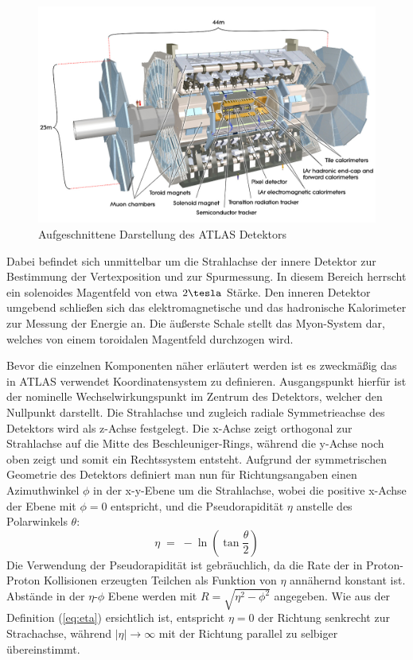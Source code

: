 \begin{figure}
    \centering
    \includegraphics[width=1.0\textwidth]{img/atlas}
    \caption[Aufgeschnittene Darstellung des ATLAS Detektors]
        {Aufgeschnittene Darstellung des ATLAS Detektors}
    \label{fig:atlas}
\end{figure}

Dabei befindet sich unmittelbar um die Strahlachse der innere Detektor zur
Bestimmung der Vertexposition und zur Spurmessung. In diesem Bereich herrscht
ein solenoides Magentfeld von etwa $2\tesla$ Stärke. Den inneren Detektor
umgebend schließen sich das elektromagnetische und das hadronische Kalorimeter
zur Messung der Energie an. Die äußerste Schale stellt das Myon-System dar,
welches von einem toroidalen Magentfeld durchzogen wird.

Bevor die einzelnen Komponenten näher erläutert werden ist es zweckmäßig das in
ATLAS verwendet Koordinatensystem zu definieren. Ausgangspunkt hierfür ist der
nominelle Wechselwirkungspunkt im Zentrum des Detektors, welcher den Nullpunkt
darstellt. Die Strahlachse und zugleich radiale Symmetrieachse des Detektors
wird als z-Achse festgelegt. Die x-Achse zeigt orthogonal zur Strahlachse auf
die Mitte des Beschleuniger-Rings, während die y-Achse noch oben zeigt und
somit ein Rechtssystem entsteht. Aufgrund der symmetrischen Geometrie des
Detektors definiert man nun für Richtungsangaben einen Azimuthwinkel
$\phi$ in der x-y-Ebene um die Strahlachse, wobei die positive x-Achse der
Ebene mit $\phi=0$ entspricht, und die Pseudorapidität $\eta$ anstelle des
Polarwinkels $\theta$:
\begin{equation}
    \eta \; = \; - \ln \left( \tan\frac{\theta}{2} \right)
    \label{eq:eta}
\end{equation}
Die Verwendung der Pseudorapidität ist gebräuchlich, da die Rate der in
Proton-Proton Kollisionen erzeugten Teilchen als Funktion von $\eta$ annähernd
konstant ist. Abstände in der $\eta$-$\phi$ Ebene werden mit
$R=\sqrt{\eta^2-\phi^2}$ angegeben. Wie aus der Definition (\ref{eq:eta})
ersichtlich ist, entspricht $\eta=0$ der Richtung senkrecht zur Strachachse,
während $|\eta| \rightarrow \infty$ mit der Richtung parallel zu selbiger
übereinstimmt.

